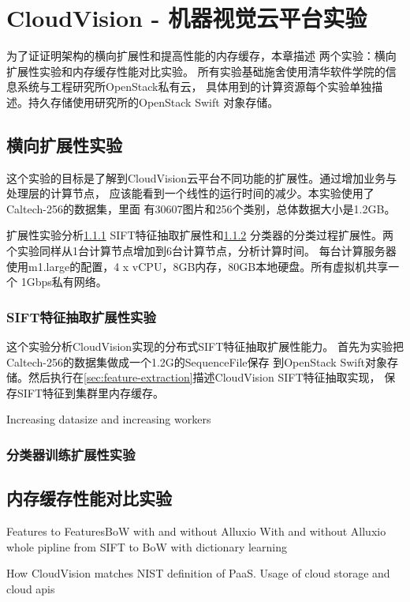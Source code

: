 \chapter{CloudVision - 机器视觉云平台实验}
\label{cha:cloudvision_experiment}
为了证证明架构的横向扩展性和提高性能的内存缓存，本章描述
两个实验：横向扩展性实验和内存缓存性能对比实验。
所有实验基础施舍使用清华软件学院的信息系统与工程研究所OpenStack私有云，
具体用到的计算资源每个实验单独描述。持久存储使用研究所的OpenStack Swift
对象存储。


\section{横向扩展性实验}
\label{sec:scalability-experiment}
这个实验的目标是了解到CloudVision云平台不同功能的扩展性。通过增加业务与处理层的计算节点，
应该能看到一个线性的运行时间的减少。本实验使用了Caltech-256的数据集，里面
有30607图片和256个类别，总体数据大小是1.2GB。

扩展性实验分析\ref{subsec:sift-scalability} SIFT特征抽取扩展性和\ref{subsec:classifier-scalability}
分类器的分类过程扩展性。两个实验同样从1台计算节点增加到6台计算节点，分析计算时间。
每台计算服务器使用m1.large的配置，4 x vCPU，8GB内存，80GB本地硬盘。所有虚拟机共享一个
1Gbps私有网络。

\subsection{SIFT特征抽取扩展性实验}
\label{subsec:sift-scalability}
这个实验分析CloudVision实现的分布式SIFT特征抽取扩展性能力。
首先为实验把Caltech-256的数据集做成一个1.2G的SequenceFile保存
到OpenStack Swift对象存储。然后执行在\ref{sec:feature-extraction}描述CloudVision SIFT特征抽取实现，
保存SIFT特征到集群里内存缓存。

Increasing datasize and increasing workers


\subsection{分类器训练扩展性实验}
\label{subsec:classifier-scalability}



\section{内存缓存性能对比实验}
\label{sec:memory-cache-experiment}
Features to FeaturesBoW with and without Alluxio
With and without Alluxio whole pipline from SIFT to BoW with dictionary learning

How CloudVision matches NIST definition of PaaS. 
Usage of cloud storage and cloud apis
